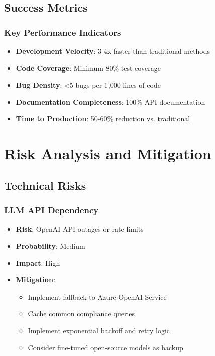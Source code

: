 \documentclass[12pt,a4paper]{report}
\begin{document}
\section{Success Metrics}

\subsection{Key Performance Indicators}
\begin{itemize}
    \item \textbf{Development Velocity}: 3-4x faster than traditional methods
    \item \textbf{Code Coverage}: Minimum 80\% test coverage
    \item \textbf{Bug Density}: <5 bugs per 1,000 lines of code
    \item \textbf{Documentation Completeness}: 100\% API documentation
    \item \textbf{Time to Production}: 50-60\% reduction vs. traditional
\end{itemize}

\chapter{Risk Analysis and Mitigation}

\section{Technical Risks}

\subsection{LLM API Dependency}
\begin{itemize}
    \item \textbf{Risk}: OpenAI API outages or rate limits
    \item \textbf{Probability}: Medium
    \item \textbf{Impact}: High
    \item \textbf{Mitigation}: 
    \begin{itemize}
        \item Implement fallback to Azure OpenAI Service
        \item Cache common compliance queries
        \item Implement exponential backoff and retry logic
        \item Consider fine-tuned open-source models as backup
    \end{itemize}
\end{itemize}
\end{document}
